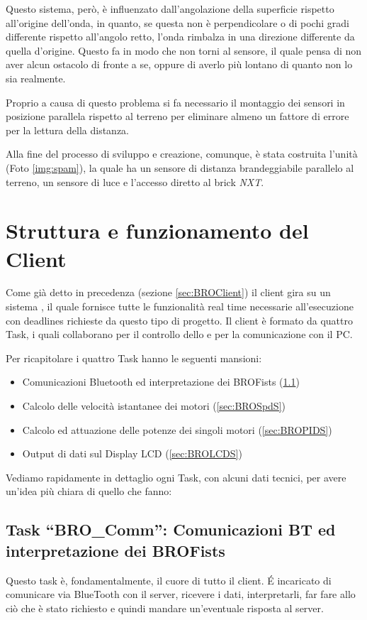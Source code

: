 Questo sistema, però, è influenzato dall'angolazione della superficie
rispetto all'origine dell'onda, in quanto, se questa non è perpendicolare o
di pochi gradi differente rispetto all'angolo retto, l'onda 
rimbalza in una direzione differente da quella d'origine. Questo fa in
modo che non torni al sensore, il quale pensa di non aver alcun ostacolo di
fronte a se, oppure di averlo più lontano di quanto non lo sia realmente.

Proprio a causa di questo problema si fa necessario il montaggio dei
sensori in posizione parallela rispetto al terreno per eliminare almeno un
fattore di errore per la lettura della distanza.

Alla fine del processo di sviluppo e creazione, comunque, è stata costruita
l'unità \SPAM{} (Foto \ref{img:spam}), la quale ha un sensore di distanza
brandeggiabile parallelo al terreno, un sensore di luce e l'accesso diretto
al brick \emph{NXT}.

\section{Struttura e funzionamento del Client}\label{sec:clientstru}
Come già detto in precedenza (sezione \ref{sec:BROClient}) il client
\BROFist{} gira su un sistema \nxtOSEK{}, il quale fornisce tutte le
funzionalità real time necessarie all'esecuzione con deadlines richieste da
questo tipo di progetto. Il client è formato da quattro Task, i quali
collaborano per il controllo dello \SPAM{} e per la comunicazione con il PC.

Per ricapitolare i quattro Task hanno le seguenti mansioni:
\begin{itemize}
    \item Comunicazioni Bluetooth ed interpretazione dei
        BROFists (\ref{sec:BROCommS})
    \item Calcolo delle velocità istantanee dei motori (\ref{sec:BROSpdS})
    \item Calcolo ed attuazione delle potenze dei singoli
        motori (\ref{sec:BROPIDS})
    \item Output di dati sul Display LCD (\ref{sec:BROLCDS})
\end{itemize}

Vediamo rapidamente in dettaglio ogni Task, con alcuni dati tecnici, per
avere un'idea più chiara di quello che fanno:

\subsection[Task ``BRO\_Comm'']{Task ``BRO\_Comm'': Comunicazioni BT ed
interpretazione dei BROFists}\label{sec:BROCommS} 
Questo task è, fondamentalmente, il cuore di tutto il client. \'E
incaricato di comunicare via BlueTooth con il server, ricevere i dati,
interpretarli, far fare allo \SPAM{} ciò che è stato richiesto e quindi
mandare un'eventuale risposta al server.

